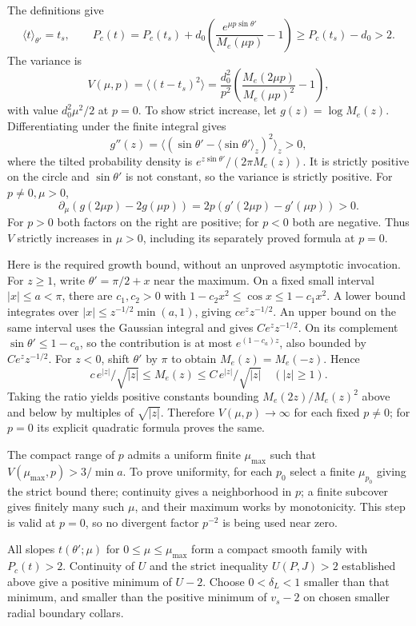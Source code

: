 \documentclass[10pt,a4paper]{article}
\begin{document}
The definitions give \[
\langle t\rangle_{\theta'}=t_s,\qquad
P_c(t)=P_c(t_s)+d_0\left(\frac{e^{\mu p\sin\theta'}}{M_e(\mu p)}-1\right)
\ge P_c(t_s)-d_0>2.
\] The variance is \[
V(\mu,p)=\langle(t-t_s)^2\rangle
=\frac{d_0^2}{p^2}
\left(\frac{M_e(2\mu p)}{M_e(\mu p)^2}-1\right),
\] with value \(d_0^2\mu^2/2\) at \(p=0\). To show strict increase, let \(g(z)=\log M_e(z)\). Differentiating under the finite integral gives \[
g''(z)=
\langle(\sin\theta'-\langle\sin\theta'\rangle_z)^2\rangle_z>0,
\] where the tilted probability density is \(e^{z\sin\theta'}/(2\pi M_e(z))\). It is strictly positive on the circle and \(\sin\theta'\) is not constant, so the variance is strictly positive. For \(p\ne0,\mu>0\), \[
\partial_\mu(g(2\mu p)-2g(\mu p))
=2p(g'(2\mu p)-g'(\mu p))>0.
\] For \(p>0\) both factors on the right are positive; for \(p<0\) both are negative. Thus \(V\) strictly increases in \(\mu>0\), including its separately proved formula at \(p=0\).

Here is the required growth bound, without an unproved asymptotic invocation. For \(z\ge1\), write \(\theta'=\pi/2+x\) near the maximum. On a fixed small interval \(|x|\le a<\pi\), there are \(c_1,c_2>0\) with \(1-c_2x^2\le\cos x\le1-c_1x^2\). A lower bound integrates over \(|x|\le z^{-1/2}\min(a,1)\), giving \(ce^zz^{-1/2}\). An upper bound on the same interval uses the Gaussian integral and gives \(Ce^zz^{-1/2}\). On its complement \(\sin\theta'\le1-c_a\), so the contribution is at most \(e^{(1-c_a)z}\), also bounded by \(Ce^zz^{-1/2}\). For \(z<0\), shift \(\theta'\) by \(\pi\) to obtain \(M_e(z)=M_e(-z)\). Hence \[
c\,e^{|z|}/\sqrt{|z|}
\le M_e(z)\le C\,e^{|z|}/\sqrt{|z|}\quad (|z|\ge1).
\] Taking the ratio yields positive constants bounding \(M_e(2z)/M_e(z)^2\) above and below by multiples of \(\sqrt{|z|}\). Therefore \(V(\mu,p)\to\infty\) for each fixed \(p\ne0\); for \(p=0\) its explicit quadratic formula proves the same.

The compact range of \(p\) admits a uniform finite \(\mu_{\max}\) such that \(V(\mu_{\max},p)>3/\min a\). To prove uniformity, for each \(p_0\) select a finite \(\mu_{p_0}\) giving the strict bound there; continuity gives a neighborhood in \(p\); a finite subcover gives finitely many such \(\mu\), and their maximum works by monotonicity. This step is valid at \(p=0\), so no divergent factor \(p^{-2}\) is being used near zero.

All slopes \(t(\theta';\mu)\) for \(0\le\mu\le\mu_{\max}\) form a compact smooth family with \(P_c(t)>2\). Continuity of \(U\) and the strict inequality \(U(P,J)>2\) established above give a positive minimum of \(U-2\). Choose \(0<\delta_L<1\) smaller than that minimum, and smaller than the positive minimum of \(v_s-2\) on chosen smaller radial boundary collars.
\end{document}
